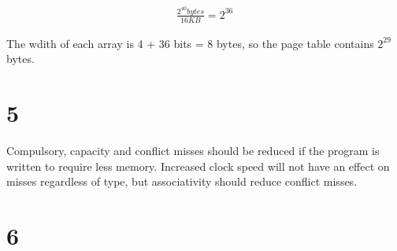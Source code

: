 \documentclass{article}
\begin{document}
\begin{align*}
\frac{2^{40} bytes}{16 KB} = 2^{36}
\end{align*}

The wdith of each array is 4 + 36 bits = 8 bytes, so the page table contains $2^{29}$ bytes.

\section*{5} 

Compulsory, capacity and conflict misses should be reduced if the program is written to require less memory. Increased clock speed will not have an effect on misses regardless of type, but associativity should reduce conflict misses.

\section*{6}
\end{document}
